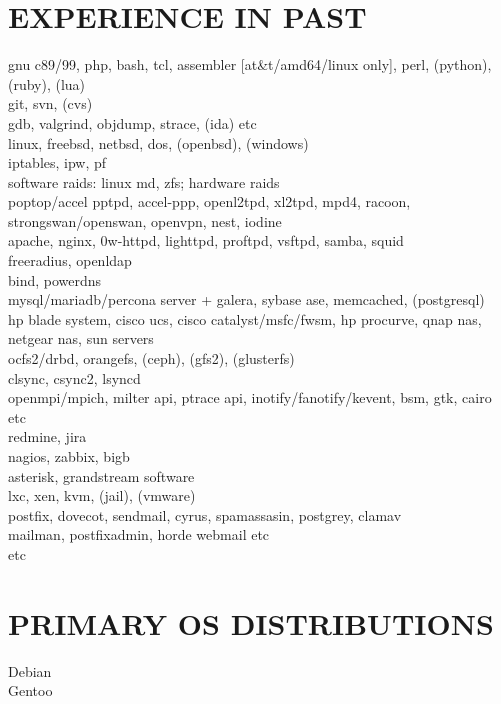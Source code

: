\begin{resume}
\section{EXPERIENCE IN PAST}
\vspace{0.1in} 
    gnu c89/99, php, bash, tcl, assembler [at\&t/amd64/linux only], perl, (python), (ruby), (lua)\\
    git, svn, (cvs)\\
    gdb, valgrind, objdump, strace, (ida) etc\\
    linux, freebsd, netbsd, dos, (openbsd), (windows)\\
    iptables, ipw, pf\\
    software raids: linux md, zfs; hardware raids\\
    poptop/accel pptpd, accel-ppp, openl2tpd, xl2tpd, mpd4, racoon, strongswan/openswan, openvpn, nest, iodine\\
    apache, nginx, 0w-httpd, lighttpd, proftpd, vsftpd, samba, squid\\
    freeradius, openldap\\
    bind, powerdns\\
    mysql/mariadb/percona server + galera, sybase ase, memcached, (postgresql)\\
    hp blade system, cisco ucs, cisco catalyst/msfc/fwsm, hp procurve, qnap nas, netgear nas, sun servers\\
    ocfs2/drbd, orangefs, (ceph), (gfs2), (glusterfs)\\
    clsync, csync2, lsyncd\\
    openmpi/mpich, milter api, ptrace api, inotify/fanotify/kevent, bsm, gtk, cairo etc\\
    redmine, jira\\
    nagios, zabbix, bigb\\
    asterisk, grandstream software\\
    lxc, xen, kvm, (jail), (vmware)\\
    postfix, dovecot, sendmail, cyrus, spamassasin, postgrey, clamav\\
    mailman, postfixadmin, horde webmail etc\\
    etc

\section{PRIMARY OS DISTRIBUTIONS}
\vspace{0.1in} 
    Debian\\
    Gentoo\\


\end{resume}
